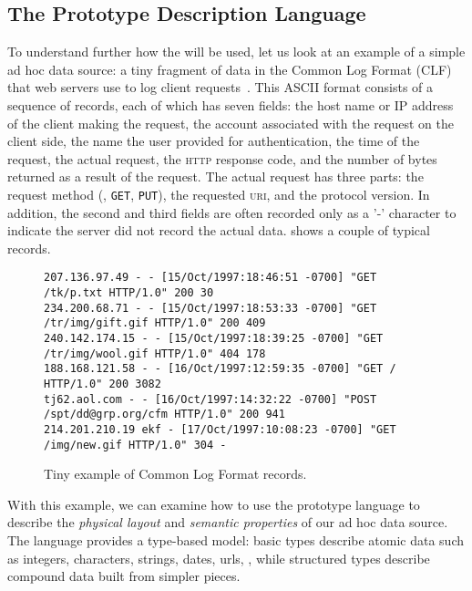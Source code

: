 
\subsection{The Prototype Description Language}
To understand further how the \pads{} will be used,
let us look at an example of a simple ad hoc data source:
a tiny fragment of data in the Common Log Format (CLF) that web
servers use to log client requests~\cite{wpp}.  
This ASCII format consists of a sequence of
records, each of which has seven fields: the host name or IP address
of the client making the request, the account associated with the
request on the client side, the name the user provided for
authentication, the time of the request, the actual request, the
\textsc{http} response code, and the number of bytes returned as a
result of the request.  The actual request has three parts: the
request method (\eg, \texttt{GET}, \texttt{PUT}), the requested
\textsc{uri}, and the protocol version.  In addition, the second and
third fields are often recorded only as a '-' character to indicate
the server did not record the actual data.  
shows a couple of typical records.



\begin{figure*}
\begin{footnotesize}
\begin{verbatim}
207.136.97.49 - - [15/Oct/1997:18:46:51 -0700] "GET /tk/p.txt HTTP/1.0" 200 30
234.200.68.71 - - [15/Oct/1997:18:53:33 -0700] "GET /tr/img/gift.gif HTTP/1.0" 200 409
240.142.174.15 - - [15/Oct/1997:18:39:25 -0700] "GET /tr/img/wool.gif HTTP/1.0" 404 178
188.168.121.58 - - [16/Oct/1997:12:59:35 -0700] "GET / HTTP/1.0" 200 3082
tj62.aol.com - - [16/Oct/1997:14:32:22 -0700] "POST /spt/dd@grp.org/cfm HTTP/1.0" 200 941
214.201.210.19 ekf - [17/Oct/1997:10:08:23 -0700] "GET /img/new.gif HTTP/1.0" 304 -
\end{verbatim}
\caption{Tiny example of Common Log Format records. }
\label{figure:clf-records}
\end{footnotesize}
\end{figure*}

With this example, we can examine how to use the prototype 
\pads{} language to describe 
the {\em physical layout} and 
{\em semantic properties} of our ad hoc data source. 
The language provides a type-based model:
basic types describe atomic data such as integers, characters, 
strings, dates, urls, \etc, while
structured types describe compound data built from simpler pieces.

